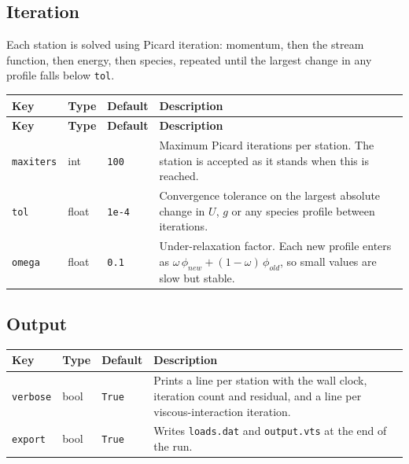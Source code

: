 \documentclass[10pt,a4paper]{article}
\renewcommand{\_}{\origunderscore\penalty4000\relax}
\begin{document}
\subsection*{Iteration}

Each station is solved using Picard iteration: momentum, then the stream function, then energy, then species, repeated until the largest change in any profile falls below \texttt{tol}.

\begin{longtable}{@{}lL{16mm}L{18mm}L{84mm}@{}}
    \toprule
    \textbf{Key} & \textbf{Type} & \textbf{Default} & \textbf{Description} \\
    \midrule
    \endfirsthead
    \toprule
    \textbf{Key} & \textbf{Type} & \textbf{Default} & \textbf{Description} \\
    \midrule
    \endhead
    \bottomrule
    \endfoot
    \endlastfoot
    \texttt{max\_iters} & int & \texttt{100} & Maximum Picard iterations per station. The station is accepted as it stands when this is reached. \\
    \addlinespace
    \texttt{tol} & float & \texttt{1e-4} & Convergence tolerance on the largest absolute change in $U$, $g$ or any species profile between iterations. \\
    \addlinespace
    \texttt{omega} & float & \texttt{0.1} & Under-relaxation factor. Each new profile enters as $\omega\,\phi_{new} + (1-\omega)\,\phi_{old}$, so small values are slow but stable. \\
    \bottomrule
\end{longtable}

\subsection*{Output}

\begin{center}
    \begin{tabular}{@{}lL{16mm}L{18mm}L{84mm}@{}}
    \toprule
    \textbf{Key} & \textbf{Type} & \textbf{Default} & \textbf{Description} \\
    \midrule
    \texttt{verbose} & bool & \texttt{True} & Prints a line per station with the wall clock, iteration count and residual, and a line per viscous-interaction iteration. \\
    \addlinespace
    \texttt{export} & bool & \texttt{True} & Writes \texttt{loads.dat} and \texttt{output.vts} at the end of the run. \\
    \bottomrule
    \end{tabular}
\end{center}
\end{document}
